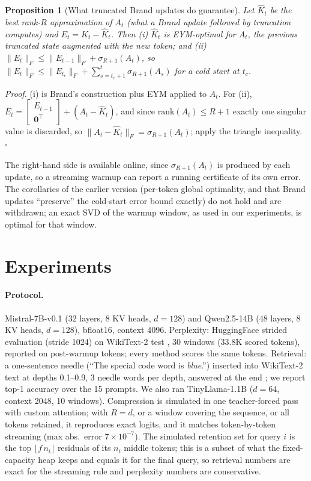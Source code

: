 \documentclass{article}
\newtheorem{proposition}{Proposition}
\begin{document}
\begin{proposition}[What truncated Brand updates do guarantee]
\label{prop:brand}
Let $\hat K_t$ be the best rank-$R$ approximation of $A_t$ (what a Brand update
followed by truncation computes) and $E_t = K_t - \hat K_t$. Then (i) $\hat K_t$
is EYM-optimal for $A_t$, the previous truncated state augmented with the new
token; and (ii)
$\lVert E_t\rVert_F \le \lVert E_{t-1}\rVert_F + \sigma_{R+1}(A_t)$, so
$\lVert E_t\rVert_F \le \lVert E_{t_c}\rVert_F + \sum_{s=t_c+1}^{t}\sigma_{R+1}(A_s)$
for a cold start at $t_c$.
\end{proposition}

\emph{Proof.} (i) is Brand's construction plus EYM applied to $A_t$. For (ii),
$E_t = \begin{bmatrix}E_{t-1}\\ \mathbf{0}^\top\end{bmatrix} + (A_t - \hat K_t)$, and
since $\mathrm{rank}(A_t) \le R{+}1$ exactly one singular value is discarded,
so $\lVert A_t - \hat K_t\rVert_F = \sigma_{R+1}(A_t)$; apply the triangle
inequality. \hfill$\square$

The right-hand side is available online, since $\sigma_{R+1}(A_t)$ is produced
by each update, so a streaming warmup can report a running certificate of its
own error. The corollaries of the earlier version (per-token global
optimality, and that Brand updates ``preserve'' the cold-start error bound
exactly) do not hold and are withdrawn; an exact SVD of the warmup window, as
used in our experiments, is optimal for that window.

\section{Experiments}
\label{sec:results}

\paragraph{Protocol.}
Mistral-7B-v0.1 \citep{mistral2023} (32 layers, 8 KV heads, $d{=}128$) and
Qwen2.5-14B \citep{qwen25} (48 layers, 8 KV heads, $d{=}128$), bfloat16,
context 4096. Perplexity: HuggingFace strided evaluation (stride 1024) on
WikiText-2 test \citep{merity2017}, 30 windows (33.8K scored tokens), reported
on post-warmup tokens; every method scores the same tokens. Retrieval: a
one-sentence needle (``The special code word is \emph{blue}.'') inserted into
WikiText-2 text at depths 0.1--0.9, 3 needle words per depth, answered at the
end \citep{niah2023}; we report top-1 accuracy over the 15 prompts. We also
ran TinyLlama-1.1B ($d{=}64$, context 2048, 10 windows). Compression is
simulated in one teacher-forced pass with custom attention; with $R{=}d$, or a
window covering the sequence, or all tokens retained, it reproduces exact
logits, and it matches token-by-token streaming (max abs.\ error
$7\times10^{-7}$). The simulated retention set for query $i$ is the top
$\lfloor f\,n_i\rfloor$ residuals of its $n_i$ middle tokens; this is a subset
of what the fixed-capacity heap keeps and equals it for the final query, so
retrieval numbers are exact for the streaming rule and perplexity numbers are
conservative.
\end{document}
